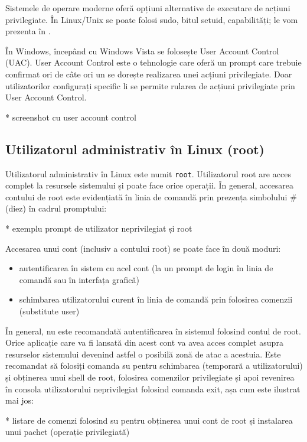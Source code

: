 Sistemele de operare moderne oferă opțiuni alternative de executare de acțiuni
privilegiate. În Linux/Unix se poate folosi sudo, bitul setuid, capabilități; le
vom prezenta în .

În Windows, începând cu Windows Vista se folosește User Account Control (UAC).
User Account Control este o tehnologie care oferă un prompt care trebuie
confirmat ori de câte ori un se dorește realizarea unei acțiuni privilegiate.
Doar utilizatorilor configurați specific li se permite rularea de acțiuni
privilegiate prin User Account Control.

* screenshot cu user account control

\subsection{Utilizatorul administrativ în Linux (root)}
\label{sec:users-superuser-root}

Utilizatorul administrativ în Linux este numit \texttt{root}. Utilizatorul root
are acces complet la resursele sistemului și poate face orice operații. În
general, accesarea contului de root este evidențiată în linia de comandă prin
prezența simbolului \# (diez) în cadrul promptului:

* exemplu prompt de utilizator neprivilegiat și root

Accesarea unui cont (inclusiv a contului root) se poate face în două moduri:

\begin{itemize}
	\item autentificarea în sistem cu acel cont (la un prompt de login în
		linia de comandă sau în interfața grafică)
	\item schimbarea utilizatorului curent în linia de comandă prin
		folosirea comenzii  (substitute user)
\end{itemize}

În general, nu este recomandată autentificarea în sistemul folosind contul de
root. Orice aplicație care va fi lansată din acest cont va avea acces complet
asupra resurselor sistemului devenind astfel o posibilă zonă de atac a acestuia.
Este recomandat să folosiți comanda su pentru schimbarea (temporară a
utilizatorului) și obținerea unui shell de root, folosirea comenzilor
privilegiate și apoi revenirea în consola utilizatorului neprivilegiat folosind
comanda exit, așa cum este ilustrat mai jos:

* listare de comenzi folosind su pentru obținerea unui cont de root și instalarea unui pachet (operație privilegiată)


